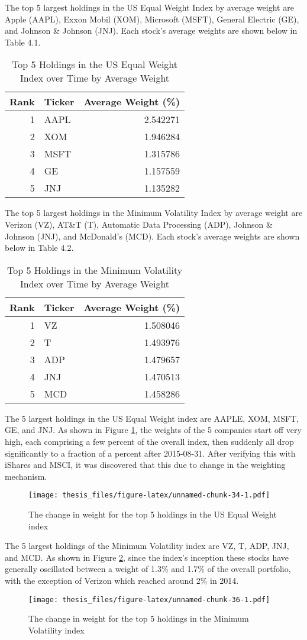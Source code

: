 \documentclass[12pt,twoside]{reedthesis}
\theoremstyle{definition}
\theoremstyle{definition}
\theoremstyle{definition}
\theoremstyle{remark}
\begin{document}
The top 5 largest holdings in the US Equal Weight Index by average
weight are Apple (AAPL), Exxon Mobil (XOM), Microsoft (MSFT), General
Electric (GE), and Johnson \& Johnson (JNJ). Each stock's average
weights are shown below in Table 4.1.
\begin{longtable}[t]{rlr}
\caption{\label{tab:unnamed-chunk-30}Top 5 Holdings in the US Equal Weight Index over Time by Average Weight}\\
\toprule
Rank & Ticker & Average Weight (\%)\\
\midrule
1 & AAPL & 2.542271\\
2 & XOM & 1.946284\\
3 & MSFT & 1.315786\\
4 & GE & 1.157559\\
5 & JNJ & 1.135282\\
\bottomrule
\end{longtable}
The top 5 largest holdings in the Minimum Volatility Index by average
weight are Verizon (VZ), AT\&T (T), Automatic Data Processing (ADP),
Johnson \& Johnson (JNJ), and McDonald's (MCD). Each stock's average
weights are shown below in Table 4.2.
\begin{longtable}[t]{rlr}
\caption{\label{tab:unnamed-chunk-32}Top 5 Holdings in the Minimum Volatility Index over Time by Average Weight}\\
\toprule
Rank & Ticker & Average Weight (\%)\\
\midrule
1 & VZ & 1.508046\\
2 & T & 1.493976\\
3 & ADP & 1.479657\\
4 & JNJ & 1.470513\\
5 & MCD & 1.458286\\
\bottomrule
\end{longtable}
The 5 largest holdings in the US Equal Weight index are AAPLE, XOM,
MSFT, GE, and JNJ. As shown in Figure \ref{fig:plot5}, the weights of
the 5 companies start off very high, each comprising a few percent of
the overall index, then suddenly all drop significantly to a fraction of
a percent after 2015-08-31. After verifying this with iShares and MSCI,
it was discovered that this due to change in the weighting
mechanism.\newline
\begin{figure}[htbp]
\centering
\texttt{[image: thesis\_files/figure-latex/unnamed-chunk-34-1.pdf]}
\caption{\label{fig:unnamed-chunk-34}The change in weight for the top 5
holdings in the US Equal Weight index\label{fig:plot5}}
\end{figure}
\newline
The 5 largest holdings of the Minimum Volatility index are VZ, T, ADP,
JNJ, and MCD. As shown in Figure \ref{fig:plot6}, since the index's
inception these stocks have generally oscillated between a weight of
1.3\% and 1.7\% of the overall portfolio, with the exception of Verizon
which reached around 2\% in 2014.
\begin{figure}[htbp]
\centering
\texttt{[image: thesis\_files/figure-latex/unnamed-chunk-36-1.pdf]}
\caption{\label{fig:unnamed-chunk-36}The change in weight for the top 5
holdings in the Minimum Volatility index\label{fig:plot6}}
\end{figure}
\clearpage
\end{document}
